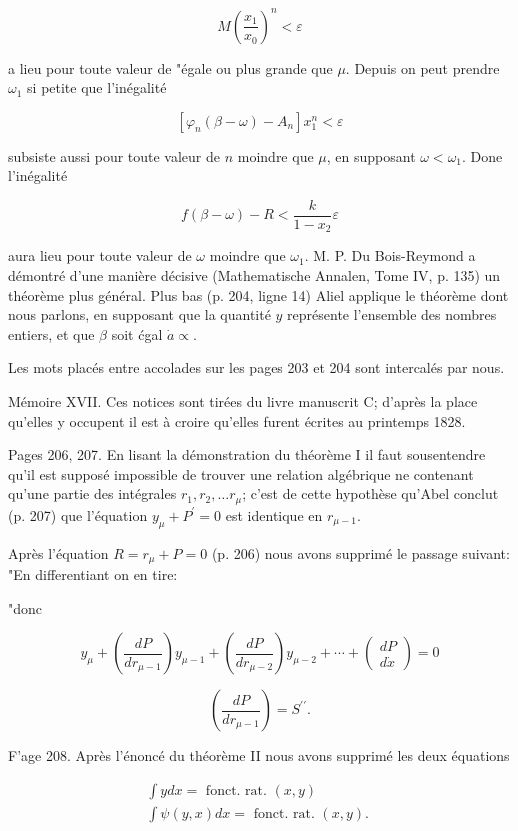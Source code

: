 \documentclass{article}
\begin{document}
\[
M\left(\frac{x_{1}}{x_{0}}\right)^{n}<\varepsilon
\]

a lieu pour toute valeur de "égale ou plus grande que \(\mu\). Depuis on peut prendre \(\omega_{1}\) si petite que l'inégalité

\[
\left[\varphi_{n}(\beta-\omega)-A_{n}\right] x_{1}^{n}<\varepsilon
\]

subsiste aussi pour toute valeur de \(n\) moindre que \(\mu\), en supposant \(\omega<\omega_{1}\). Done l'inégalité

\[
f(\beta-\omega)-R<\frac{k}{1-x_{2}} \varepsilon
\]

aura lieu pour toute valeur de \(\omega\) moindre que \(\omega_{1}\). M. P. Du Bois-Reymond a démontré d'une manière décisive (Mathematische Annalen, Tome IV, p. 135) un théorème plus général. Plus bas (p. 204, ligne 14) Aliel applique le théorème dont nous parlons, en supposant que la quantité \(y\) représente l'ensemble des nombres entiers, et que \(\beta\) soit ćgal \(\dot{a} \propto\).

Les mots placés entre accolades sur les pages 203 et 204 sont intercalés par nous.

Mémoire XVII. Ces notices sont tirées du livre manuscrit C; d'après la place qu'elles y occupent il est à croire qu'elles furent écrites au printemps 1828.

Pages 206, 207. En lisant la démonstration du théorème I il faut sousentendre qu'il est supposé impossible de trouver une relation algébrique ne contenant qu'une partie des intégrales \(r_{1}, r_{2}, \ldots r_{\mu}\); c'est de cette hypothèse qu'Abel conclut (p. 207) que l'équation \(y_{\mu}+P^{\prime}=0\) est identique en \(r_{\mu-1}\).

Après l'équation \(R=r_{\mu}+P=0\) (p. 206) nous avons supprimé le passage suivant: "En differentiant on en tire:

"donc

\[
y_{\mu}+\left(\frac{d P}{d r_{\mu-1}}\right) y_{\mu-1}+\left(\frac{d P}{d r_{\mu-2}}\right) y_{\mu-2}+\cdots+\left(\begin{array}{c}
d P \\
d \dot{x}
\end{array}\right)=0
\]

\[
\left(\frac{d P}{d r_{\mu-1}}\right)=S^{\prime \prime} .
\]

F'age 208. Après l'énoncé du théorème II nous avons supprimé les deux équations

\[
\begin{gathered}
\int y d x=\text { fonct. rat. }(x, y) \\
\int \psi(y, x) d x=\text { fonct. rat. }(x, y) \text {. }
\end{gathered}
\]
\end{document}
